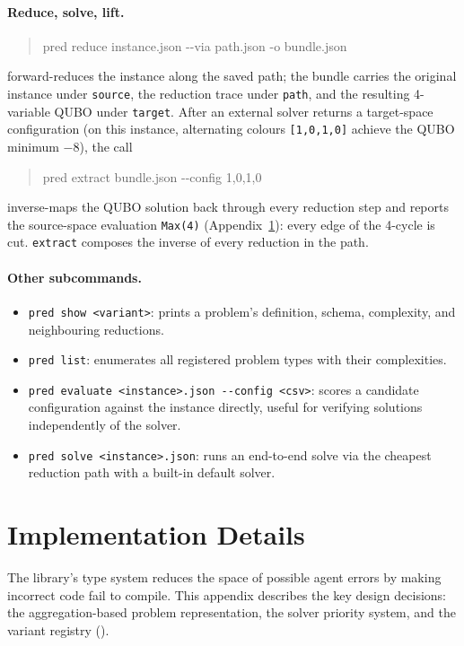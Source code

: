 \documentclass{article}
\begin{document}
\paragraph{Reduce, solve, lift.}
\begin{quote}\ttfamily\small
pred reduce instance.json -{}-via path.json -o bundle.json
\end{quote}
forward-reduces the instance along the saved path; the bundle carries the original instance under \texttt{source}, the reduction trace under \texttt{path}, and the resulting 4-variable QUBO under \texttt{target}. After an external solver returns a target-space configuration (on this instance, alternating colours \texttt{[1,0,1,0]} achieve the QUBO minimum $-8$), the call
\begin{quote}\ttfamily\small
pred extract bundle.json -{}-config 1,0,1,0
\end{quote}
inverse-maps the QUBO solution back through every reduction step and reports the source-space evaluation \texttt{Max(4)} (Appendix~\ref{app:architecture}): every edge of the 4-cycle is cut. \texttt{extract} composes the inverse of every reduction in the path.

\paragraph{Other subcommands.}
\begin{itemize}
\setlength\itemsep{1pt}
\item \texttt{pred show <variant>}: prints a problem's definition, schema, complexity, and neighbouring reductions.
\item \texttt{pred list}: enumerates all registered problem types with their complexities.
\item \texttt{pred evaluate <instance>.json -{}-config <csv>}: scores a candidate configuration against the instance directly, useful for verifying solutions independently of the solver.
\item \texttt{pred solve <instance>.json}: runs an end-to-end solve via the cheapest reduction path with a built-in default solver.
\end{itemize}

\section{Implementation Details}\label{app:architecture}

The library's type system reduces the space of possible agent errors by making incorrect code fail to compile.
This appendix describes the key design decisions: the aggregation-based problem representation, the solver priority system, and the variant registry ().
\end{document}
